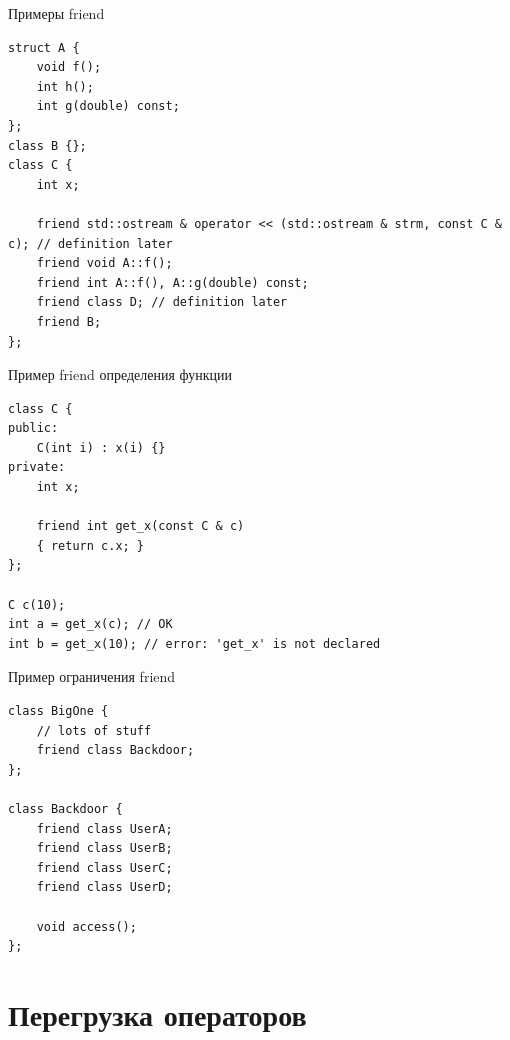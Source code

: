 \documentclass[unknownkeysallowed,xcolor=table]{beamer}
\begin{document}
\begin{frame}[fragile]{Примеры friend}
\begin{lstlisting}
struct A {
    void f();
    int h();
    int g(double) const;
};
class B {};
class C {
    int x;
    
    friend std::ostream & operator << (std::ostream & strm, const C & c); // definition later
    friend void A::f();
    friend int A::f(), A::g(double) const;
    friend class D; // definition later
    friend B;
};
\end{lstlisting}
\end{frame}

\begin{frame}[fragile]{Пример friend определения функции}
\begin{lstlisting}
class C {
public:
    C(int i) : x(i) {}
private:
    int x;
    
    friend int get_x(const C & c)
    { return c.x; }
};

C c(10);
int a = get_x(c); // OK
int b = get_x(10); // error: 'get_x' is not declared
\end{lstlisting}
\end{frame}

\begin{frame}[fragile]{Пример ограничения friend}
\begin{lstlisting}
class BigOne {
    // lots of stuff
    friend class Backdoor;
};

class Backdoor {
    friend class UserA;
    friend class UserB;
    friend class UserC;
    friend class UserD;
    
    void access();
};
\end{lstlisting}
\end{frame}



\section{Перегрузка операторов}
\end{document}
